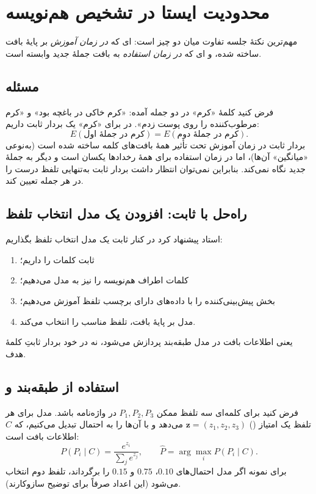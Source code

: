 \section{محدودیت  ایستا در تشخیص هم‌نویسه}

مهم‌ترین نکتهٔ جلسه تفاوت میان دو چیز است: ای که \emph{در زمان آموزش} بر پایهٔ بافت ساخته شده، و ای که \emph{در زمان استفاده} به بافت جملهٔ جدید وابسته است.

\subsection{مسئله}
فرض کنید کلمهٔ «کرم» در دو جمله آمده: «کرم خاکی در باغچه بود» و «کرم مرطوب‌کننده را روی پوست زدم». در  برای «کرم» یک بردار ثابت داریم:
\[
E(\text{کرم در جملهٔ اول})=E(\text{کرم در جملهٔ دوم}).
\]
بردار ثابت در زمان آموزش تحت تأثیر همهٔ بافت‌های کلمه ساخته شده است (به‌نوعی «میانگین» آن‌ها)، اما در زمان استفاده برای همهٔ رخدادها یکسان است و دیگر به جملهٔ جدید نگاه نمی‌کند. بنابراین نمی‌توان انتظار داشت بردار ثابت به‌تنهایی تلفظ درست را در هر جمله تعیین کند.

\subsection{راه‌حل با  ثابت: افزودن یک مدل انتخاب تلفظ}
استاد پیشنهاد کرد در کنار  ثابت یک مدل انتخاب تلفظ بگذاریم:
\begin{enumerate}
  \item {} ثابت کلمات را داریم؛
  \item کلمات اطراف هم‌نویسه را نیز به مدل می‌دهیم؛
  \item بخش پیش‌بینی‌کننده را با داده‌های دارای برچسب تلفظ آموزش می‌دهیم؛
  \item مدل بر پایهٔ بافت، تلفظ مناسب را انتخاب می‌کند.
\end{enumerate}
یعنی اطلاعات بافت در مدل طبقه‌بند پردازش می‌شود، نه در خود بردار ثابتِ کلمهٔ هدف.

\subsection{استفاده از طبقه‌بند و }
فرض کنید برای کلمه‌ای سه تلفظ ممکن $P_1,P_2,P_3$ در واژه‌نامه باشد. مدل برای هر تلفظ یک امتیاز () $\mathbf{z}=(z_1,z_2,z_3)$ می‌دهد و با  آن‌ها را به احتمال تبدیل می‌کنیم، که $C$ اطلاعات بافت است:
\[
P(P_i\mid C)=\frac{e^{z_i}}{\sum_j e^{z_j}},\qquad
\hat P=\arg\max_i P(P_i\mid C).
\]
برای نمونه اگر مدل احتمال‌های $0.10$، $0.75$ و $0.15$ را برگرداند، تلفظ دوم انتخاب می‌شود (این اعداد صرفاً برای توضیح سازوکارند).

